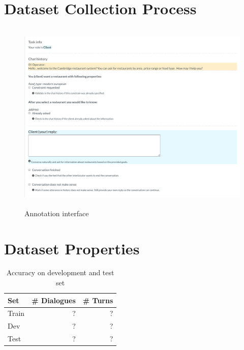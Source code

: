 \documentclass[runningheads,a4paper]{llncs}
\begin{document}
\section{Dataset Collection Process}
\label{sec:collection}

\begin{figure}
\begin{center}
\includegraphics[height=25em]{gui-annotators-client}
\caption{Annotation interface}
\end{center}
\vspace{-0.80em}
\label{fig:encind}
\end{figure}

\section{Dataset Properties}
\label{sec:props}

\begin{table}
\begin{center}
\begin{tabular}{lrr}
\hline
Set   & \# Dialogues & \# Turns \\
\hline
Train  &   ? & ? \\
Dev &   ? & ? \\
Test &   ? & ? \\
\hline
\end{tabular}
\caption{Accuracy on development and test set}
\vspace{-2em}
\end{center}
\label{tab:props}
\end{table}
\end{document}
